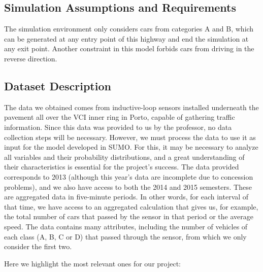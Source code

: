 \documentclass[conference]{IEEEtran}
\begin{document}
\subsection{Simulation Assumptions and Requirements}
The simulation environment only considers cars from categories A and B, which can be generated at any entry point of this highway and end the simulation at any exit point. Another constraint in this model forbids cars from driving in the reverse direction.

\subsection{Dataset Description}

The data we obtained comes from inductive-loop sensors installed underneath the pavement all over the VCI inner ring in Porto, capable of gathering traffic information.
Since this data was provided to us by the professor, no data collection steps will be necessary. However, we must process the data to use it as input for the model developed in SUMO. For this, it may be necessary to analyze all variables and their probability distributions, and a great understanding of their characteristics is essential for the project's success.
The data provided corresponds to 2013 (although this year's data are incomplete due to concession problems), and we also have access to both the 2014 and 2015 semesters.
These are aggregated data in five-minute periods. In other words, for each interval of that time, we have access to an aggregated calculation that gives us, for example, the total number of cars that passed by the sensor in that period or the average speed.
The data contains many attributes, including the number of vehicles of each class (A, B, C or D) that passed through the sensor, from which we only consider the first two.

Here we highlight the most relevant ones for our project:
\end{document}
